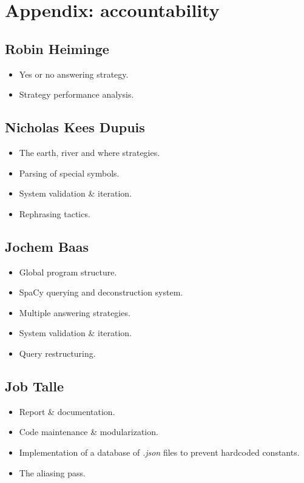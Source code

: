 \documentclass{article}
\begin{document}
\section{Appendix: accountability}
\subsection{Robin Heiminge}
\begin{itemize}
    \item Yes or no answering strategy.
    \item Strategy performance analysis.
\end{itemize}

\subsection{Nicholas Kees Dupuis}
\begin{itemize}
    \item The earth, river and where strategies.
    \item Parsing of special symbols.
    \item System validation \& iteration.
    \item Rephrasing tactics.
\end{itemize}

\subsection{Jochem Baas}
\begin{itemize}
    \item Global program structure.
    \item SpaCy querying and deconstruction system.
    \item Multiple answering strategies.
    \item System validation \& iteration.
    \item Query restructuring.
\end{itemize}

\subsection{Job Talle}
\begin{itemize}
    \item Report \& documentation.
    \item Code maintenance \& modularization.
    \item Implementation of a database of \emph{.json} files to prevent hardcoded constants.
    \item The aliasing pass.
\end{itemize}
\end{document}
